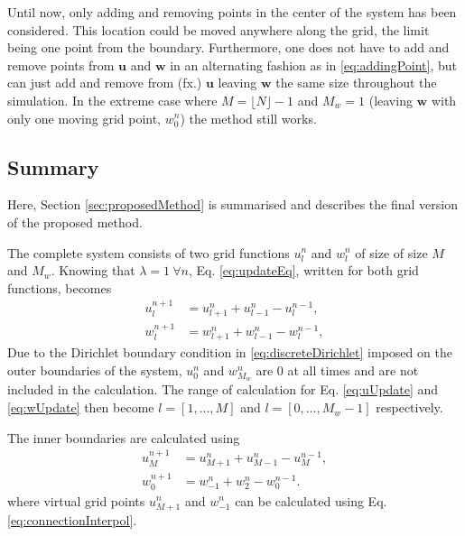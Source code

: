 Until now, only adding and removing points in the center of the system has been considered. This location could be moved anywhere along the grid, the limit being one point from the boundary. Furthermore, one does not have to add and remove points from $\mathbf{u}$ and $\mathbf{w}$ in an alternating fashion as in \eqref{eq:addingPoint}, but can just add and remove from (fx.) $\mathbf{u}$ leaving $\mathbf{w}$ the same size throughout the simulation. In the extreme case where $M = \lfloor N\rfloor - 1$ and $M_w = 1$ (leaving $\mathbf{w}$ with only one moving grid point, $w_0^n$) the method still works.
% 

\subsection{Summary}
Here, Section \ref{sec:proposedMethod} is summarised and describes the final version of the proposed method.

The complete system consists of two grid functions $u_l^n$ and $w_l^n$ of size of size $M$ and $M_w$. Knowing that $\lambda=1\ \forall n$, Eq. \eqref{eq:updateEq}, written for both grid functions, becomes 
\begin{subequations}\label{eq:uwUpdates}
    \begin{align}
        u_l^{n+1} &= u_{l+1}^n + u_{l-1}^n - u_l^{n-1},\label{eq:uUpdate}\\
        w_l^{n+1} &= w_{l+1}^n + w_{l-1}^n - w_l^{n-1}\label{eq:wUpdate},
    \end{align}
\end{subequations}
%
Due to the Dirichlet boundary condition in \eqref{eq:discreteDirichlet} imposed on the outer boundaries of the system, $u_0^n$ and $w_{M_w}^n$ are $0$ at all times and are not included in the calculation. The range of calculation for Eq. \eqref{eq:uUpdate} and \eqref{eq:wUpdate} then become $l = [1, \hdots, M]$ and $l = [0, \hdots, M_w - 1]$ respectively. 

The inner boundaries are calculated using
\begin{subequations}
    \begin{align}
        u_M^{n+1} &= u_{M+1}^n + u_{M-1}^n - u_M^{n-1},\\
        w_0^{n+1} &= w_{-1}^n + w_{2}^n - w_0^{n-1}.
    \end{align}
\end{subequations}
%
where virtual grid points $u_{M+1}^n$ and $w_{-1}^n$ can be calculated using Eq. \eqref{eq:connectionInterpol}.

